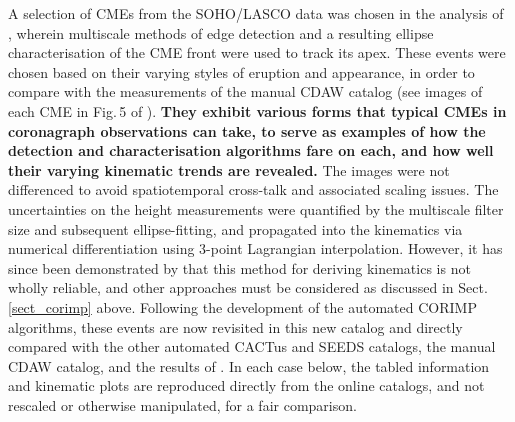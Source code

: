 \documentclass[referee,a4paper,12pt,traditabstract]{swsc}
\begin{document}
\begin{linenumbers}
A selection of CMEs from the SOHO/LASCO data was chosen in the analysis of \cite{2009A&A...495..325B}, wherein multiscale methods of edge detection and a resulting ellipse characterisation of the CME front were used to track its apex. These events were chosen based on their varying styles of eruption and appearance, in order to compare with the measurements of the manual CDAW catalog (see images of each CME in Fig.\,5 of \citealt{2009A&A...495..325B}). {\bf They exhibit various forms that typical CMEs in coronagraph observations can take, to serve as examples of how the detection and characterisation algorithms fare on each, and how well their varying kinematic trends are revealed.} The images were not differenced to avoid spatiotemporal cross-talk and associated scaling issues. The uncertainties on the height measurements were quantified by the multiscale filter size and subsequent ellipse-fitting, and propagated into the kinematics via numerical differentiation using 3-point Lagrangian interpolation. However, it has since been demonstrated by \cite{2013A&A...557A..96B} that this method for deriving kinematics is not wholly reliable, and other approaches must be considered as discussed in Sect.\,\ref{sect_corimp} above. Following the development of the automated CORIMP algorithms, these events are now revisited in this new catalog and directly compared with the other automated CACTus and SEEDS catalogs, the manual CDAW catalog, and the results of \cite{2009A&A...495..325B}. In each case below, the tabled information and kinematic plots are reproduced directly from the online catalogs, and not rescaled or otherwise manipulated, for a fair comparison. %





\end{linenumbers}
\end{document}

